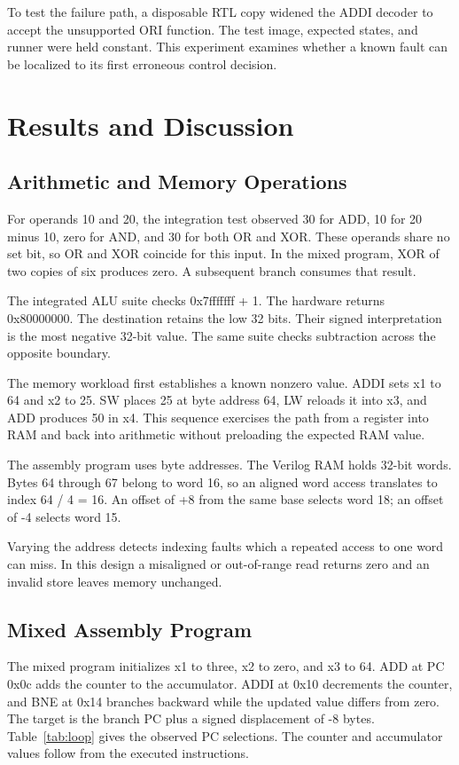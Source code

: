 \documentclass[conference,letterpaper]{IEEEtran}
\begin{document}
To test the failure path, a disposable RTL copy widened the ADDI decoder to accept the unsupported ORI function. The test image, expected states, and runner were held constant. This experiment examines whether a known fault can be localized to its first erroneous control decision.

\section{Results and Discussion}

\subsection{Arithmetic and Memory Operations}

For operands 10 and 20, the integration test observed 30 for ADD, 10 for 20 minus 10, zero for AND, and 30 for both OR and XOR. These operands share no set bit, so OR and XOR coincide for this input. In the mixed program, XOR of two copies of six produces zero. A subsequent branch consumes that result.

The integrated ALU suite checks 0x7fffffff + 1. The hardware returns 0x80000000. The destination retains the low 32 bits. Their signed interpretation is the most negative 32-bit value. The same suite checks subtraction across the opposite boundary.

The memory workload first establishes a known nonzero value. ADDI sets x1 to 64 and x2 to 25. SW places 25 at byte address 64, LW reloads it into x3, and ADD produces 50 in x4. This sequence exercises the path from a register into RAM and back into arithmetic without preloading the expected RAM value.

The assembly program uses byte addresses. The Verilog RAM holds 32-bit words. Bytes 64 through 67 belong to word 16, so an aligned word access translates to index 64 / 4 = 16. An offset of +8 from the same base selects word 18; an offset of -4 selects word 15.

Varying the address detects indexing faults which a repeated access to one word can miss. In this design a misaligned or out-of-range read returns zero and an invalid store leaves memory unchanged.

\subsection{Mixed Assembly Program}

The mixed program initializes x1 to three, x2 to zero, and x3 to 64. ADD at PC 0x0c adds the counter to the accumulator. ADDI at 0x10 decrements the counter, and BNE at 0x14 branches backward while the updated value differs from zero. The target is the branch PC plus a signed displacement of -8 bytes. Table~\ref{tab:loop} gives the observed PC selections. The counter and accumulator values follow from the executed instructions.
\end{document}
